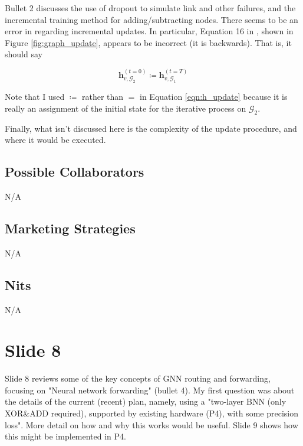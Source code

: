 \documentclass[11pt, oneside]{article}   	%
\begin{document}
\bigskip
\noindent
Bullet 2 discusses the use of dropout to simulate link and other failures, and the incremental training method for adding/subtracting 
nodes. There seems to be an error in \cite{DBLP:conf/sigcomm/GeyerC18} regarding incremental updates. In particular, Equation 16 
in \cite{DBLP:conf/sigcomm/GeyerC18}, shown in Figure \ref{fig:graph_update}, appears to be incorrect (it is backwards). That is,  it should say

\begin{equation}
\textbf{h}_{v, \mathcal{G}_2}^{(t = 0)} \coloneqq  \textbf{h}_{v, \mathcal{G}_1}^{(t = T)}
\label{eqn:h_update}
\end{equation}

\bigskip
\noindent
Note that I used $\coloneqq$ rather than $=$ in Equation \ref{eqn:h_update} because it is really an assignment of the initial state for the iterative process 
on $\mathcal{G}_2$.

\bigskip
\noindent
Finally, what isn't discussed here is the complexity of the update procedure, and where it would be executed.

\subsection{Possible Collaborators}
\label{slide7:possible_collaborators}
N/A

\subsection{Marketing Strategies}
\label{slide7:marketing_strategies}
N/A

\subsection{Nits}
\label{slide7:nits}
N/A


\section{Slide 8}
\label{sec:slide8}
Slide 8 reviews some of the key concepts of GNN routing and forwarding, focusing on "Neural network forwarding" (bullet 4). My first question
was about the details of the current (recent) plan, namely, using a "two-layer BNN (only XOR\&ADD required), supported by existing hardware 
(P4), with some precision loss". More detail on how and why this works would be useful.  Slide 9 shows how this might be implemented in P4.
\end{document}
